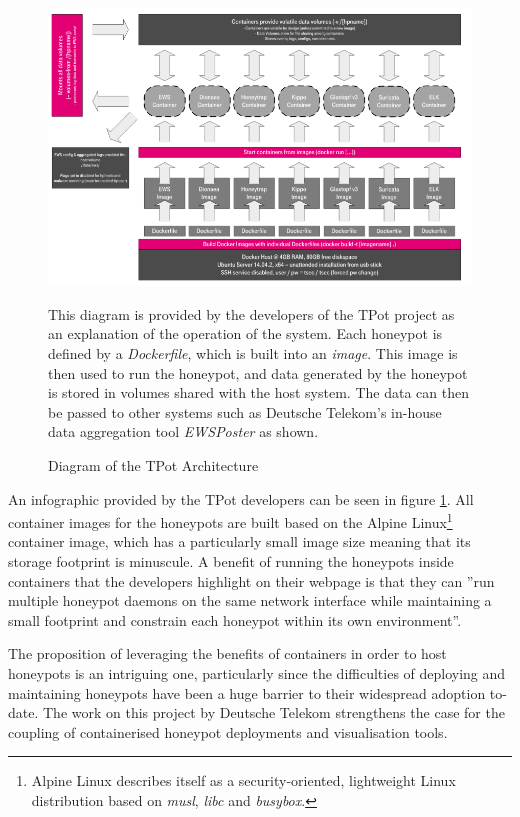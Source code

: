     \begin{figure}[ht]
      \centering
      \includegraphics[width=160mm, scale=1]{Images/t-pot-diagram.PNG}
      \caption{Diagram of the TPot Architecture} 
      \medskip
	  \small
		This diagram is provided by the developers of the TPot project as an explanation of the operation of the system. \cite{TPotWebpagev16} Each honeypot is defined by a \textit{Dockerfile}, which is built into an \textit{image}. This image is then used to run the honeypot, and data generated by the honeypot is stored in volumes shared with the host system. The data can then be passed to other systems such as Deutsche Telekom's in-house data aggregation tool \textit{EWSPoster} as shown. 
\label{fig:Images/t-pot-diagram.PNG}
\end{figure}
    
    An infographic provided by the TPot developers can be seen in figure \ref{fig:Images/t-pot-diagram.PNG}. All container images for the honeypots are built based on the Alpine Linux\footnote{Alpine Linux describes itself as a security-oriented, lightweight Linux distribution based on \textit{musl}, \textit{libc} and \textit{busybox}.} container image, which has a particularly small image size meaning that its storage footprint is minuscule. A benefit of running the honeypots inside containers that the developers highlight on their webpage is that they can ''run multiple honeypot daemons on the same network interface while maintaining a small footprint and constrain each honeypot within its own environment''. \cite{TPotWebpagev16}

The proposition of leveraging the benefits of containers in order to host honeypots is an intriguing one, particularly since the difficulties of deploying and maintaining honeypots have been a huge barrier to their widespread adoption to-date. The work on this project by Deutsche Telekom strengthens the case for the coupling of containerised honeypot deployments and visualisation tools.
    
